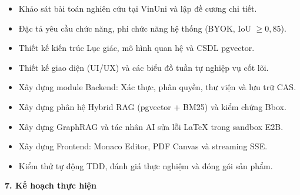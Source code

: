 \begin{itemize}[leftmargin=*, noitemsep, topsep=1.5pt, parsep=0pt, partopsep=0pt]
    \item[--] Khảo sát bài toán nghiên cứu tại VinUni và lập đề cương chi tiết.
    \item[--] Đặc tả yêu cầu chức năng, phi chức năng hệ thống (BYOK, IoU $\ge 0{,}85$).
    \item[--] Thiết kế kiến trúc Lục giác, mô hình quan hệ và CSDL pgvector.
    \item[--] Thiết kế giao diện (UI/UX) và các biểu đồ tuần tự nghiệp vụ cốt lõi.
    \item[--] Xây dựng module Backend: Xác thực, phân quyền, thư viện và lưu trữ CAS.
    \item[--] Xây dựng phân hệ Hybrid RAG (pgvector + BM25) và kiểm chứng Bbox.
    \item[--] Xây dựng GraphRAG và tác nhân AI sửa lỗi LaTeX trong sandbox E2B.
    \item[--] Xây dựng Frontend: Monaco Editor, PDF Canvas và streaming SSE.
    \item[--] Kiểm thử tự động TDD, đánh giá thực nghiệm và đóng gói sản phẩm.
\end{itemize}

\newpage
\thispagestyle{adminform}

\noindent \textbf{7. Kế hoạch thực hiện}
\vspace{0.04cm}


